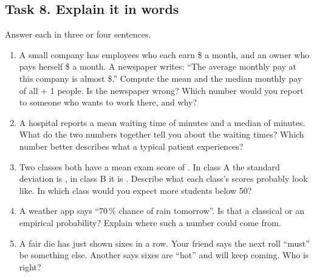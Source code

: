 \subsection*{Task 8. Explain it in words}
Answer each in three or four sentences.
\begin{enumerate}[label=(\alph*)]
  \item A small company has \hwStaff{} employees who each earn \$\hwStaffPay{} a month, and an owner who pays herself
        \$\hwOwnerPay{} a month. A newspaper writes: ``The average monthly pay at this company is almost
        \$\hwNewsClaim.'' Compute the mean and the median monthly pay of all \hwStaff{} + 1 people. Is the newspaper
        wrong? Which number would you report to someone who wants to work there, and why?
  \item A hospital reports a mean waiting time of \hwWaitMean{} minutes and a median of \hwWaitMedian{} minutes. What do
        the two numbers together tell you about the waiting times? Which number better describes what a typical
        patient experiences?
  \item Two classes both have a mean exam score of \hwClassMean. In class A the standard deviation is \hwClassSdA{}, in
        class B it is \hwClassSdB. Describe what each class's scores probably look like. In which class would you
        expect more students below 50?
  \item A weather app says ``70\,\% chance of rain tomorrow''. Is that a classical or an empirical probability? Explain
        where such a number could come from.
  \item A fair die has just shown \hwStreak{} sixes in a row. Your friend says the next roll ``must'' be something else.
        Another says sixes are ``hot'' and will keep coming. Who is right?
\end{enumerate}

